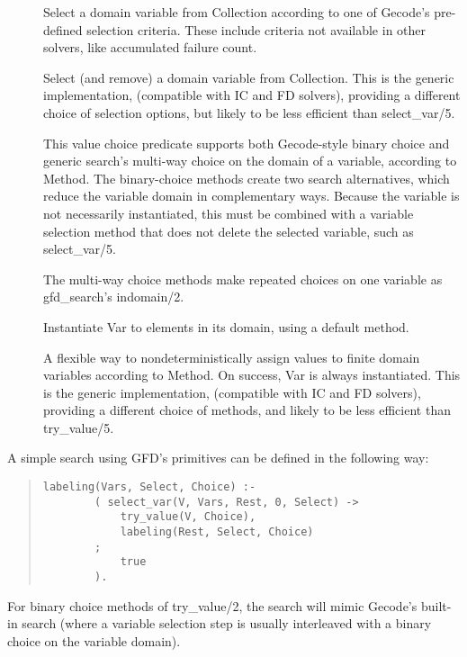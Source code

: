 \begin{description}
\item[]
Select a domain variable from Collection according to one of Gecode's
pre-defined selection criteria.  These include criteria not available in
other {\eclipse} solvers, like accumulated failure count.

\item[]
Select (and remove) a domain variable from Collection.  This is the
generic implementation, (compatible with IC and FD solvers), providing
a different choice of selection options, but likely to be less
efficient than select_var/5.

\item[]
This value choice predicate supports both Gecode-style binary choice and 
generic search's multi-way choice on the domain of a variable,
according to Method.
The binary-choice methods create two search alternatives, which reduce the variable domain
in complementary ways.  Because the variable is not necessarily instantiated,
this must be combined with a variable selection method that does not delete
the selected variable, such as select_var/5.

The multi-way choice methods make repeated choices on one variable as 
gfd_search's indomain/2.

\item[]
Instantiate Var to elements in its domain, using a default method.

\item[]
A flexible way to nondeterministically assign values to finite domain
variables according to Method.  On success, Var is always instantiated.
This is the generic implementation,
(compatible with IC and FD solvers), providing a different choice of methods,
and likely to be less efficient than try_value/5.
\end{description}

A simple search using GFD's primitives can be defined in the following way: 
\begin{quote}
\begin{verbatim}
labeling(Vars, Select, Choice) :-
        ( select_var(V, Vars, Rest, 0, Select) ->
            try_value(V, Choice),
            labeling(Rest, Select, Choice)
        ;
            true
        ).
\end{verbatim}
\end{quote}
For binary choice methods of try_value/2, the search will 
mimic Gecode's built-in search (where a variable selection step is usually
interleaved with a binary choice on the variable domain).

